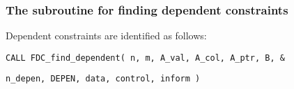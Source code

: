 \documentclass{galahad}
\newcommand{\packagename}{FDC}
\begin{document}

\subsubsection{The subroutine for finding dependent constraints}
Dependent constraints are identified as follows:

\vspace*{1mm}

\hspace{8mm}
{\tt CALL \packagename\_find\_dependent( n, m, A\_val, A\_col, A\_ptr, B,
  \&}
\vspace*{-1mm}

\hspace{52mm}
{\tt    n\_depen, DEPEN, data, control, inform )}

\end{document}
